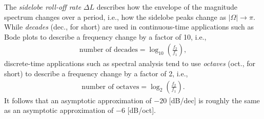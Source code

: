 \documentclass{report}
\begin{document}
The \emph{sidelobe roll-off rate} $\Delta L$ describes how the envelope of the magnitude spectrum changes over a period, i.e., how the sidelobe peaks change as $|\Omega|\to\pi$. 
While \emph{decades} (dec., for short) are used in continuous-time applications such as Bode plots to describe a frequency change by a factor of 10, i.e., 
\begin{align}
    \text{number of decades} = \log_{10}\left(\frac{f_2}{f_1}\right),
\end{align}
discrete-time applications such as spectral analysis tend to use \emph{octaves} (oct., for short) to describe a frequency change by a factor of 2, i.e.,
\begin{align}
    \text{number of octaves} = \log_2\left(\frac{f_2}{f_1}\right).
\end{align}
It follows that an asymptotic approximation of $-20$ [dB/dec] is roughly the same as an asymptotic approximation of $-6$ [dB/oct].
\begin{center}
\end{center}
\end{document}
